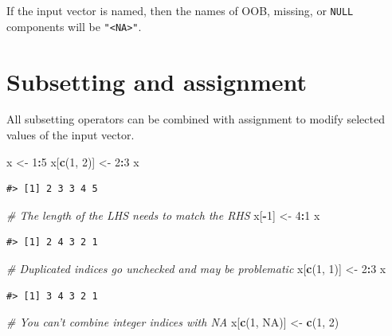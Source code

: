 \documentclass[]{book}
\newenvironment{Shaded}{\begin{snugshade}}{\end{snugshade}}
\newcommand{\KeywordTok}[1]{\textcolor[rgb]{0.13,0.29,0.53}{\textbf{#1}}}
\newcommand{\DecValTok}[1]{\textcolor[rgb]{0.00,0.00,0.81}{#1}}
\newcommand{\StringTok}[1]{\textcolor[rgb]{0.31,0.60,0.02}{#1}}
\newcommand{\CommentTok}[1]{\textcolor[rgb]{0.56,0.35,0.01}{\textit{#1}}}
\newcommand{\OtherTok}[1]{\textcolor[rgb]{0.56,0.35,0.01}{#1}}
\newcommand{\OperatorTok}[1]{\textcolor[rgb]{0.81,0.36,0.00}{\textbf{#1}}}
\newcommand{\NormalTok}[1]{#1}
\theoremstyle{definition}
\theoremstyle{definition}
\theoremstyle{definition}
\theoremstyle{remark}
\begin{document}
If the input vector is named, then the names of OOB, missing, or
\texttt{NULL} components will be \texttt{"\textless{}NA\textgreater{}"}.

\section{Subsetting and assignment}\label{subassignment}

All subsetting operators can be combined with assignment to modify
selected values of the input vector.

\begin{Shaded}
\begin{Highlighting}[]
\NormalTok{x <-}\StringTok{ }\DecValTok{1}\OperatorTok{:}\DecValTok{5}
\NormalTok{x[}\KeywordTok{c}\NormalTok{(}\DecValTok{1}\NormalTok{, }\DecValTok{2}\NormalTok{)] <-}\StringTok{ }\DecValTok{2}\OperatorTok{:}\DecValTok{3}
\NormalTok{x}
\end{Highlighting}
\end{Shaded}

\begin{verbatim}
#> [1] 2 3 3 4 5
\end{verbatim}

\begin{Shaded}
\begin{Highlighting}[]
\CommentTok{# The length of the LHS needs to match the RHS}
\NormalTok{x[}\OperatorTok{-}\DecValTok{1}\NormalTok{] <-}\StringTok{ }\DecValTok{4}\OperatorTok{:}\DecValTok{1}
\NormalTok{x}
\end{Highlighting}
\end{Shaded}

\begin{verbatim}
#> [1] 2 4 3 2 1
\end{verbatim}

\begin{Shaded}
\begin{Highlighting}[]
\CommentTok{# Duplicated indices go unchecked and may be problematic}
\NormalTok{x[}\KeywordTok{c}\NormalTok{(}\DecValTok{1}\NormalTok{, }\DecValTok{1}\NormalTok{)] <-}\StringTok{ }\DecValTok{2}\OperatorTok{:}\DecValTok{3}
\NormalTok{x}
\end{Highlighting}
\end{Shaded}

\begin{verbatim}
#> [1] 3 4 3 2 1
\end{verbatim}

\begin{Shaded}
\begin{Highlighting}[]
\CommentTok{# You can't combine integer indices with NA}
\NormalTok{x[}\KeywordTok{c}\NormalTok{(}\DecValTok{1}\NormalTok{, }\OtherTok{NA}\NormalTok{)] <-}\StringTok{ }\KeywordTok{c}\NormalTok{(}\DecValTok{1}\NormalTok{, }\DecValTok{2}\NormalTok{)}
\end{Highlighting}
\end{Shaded}
\end{document}
